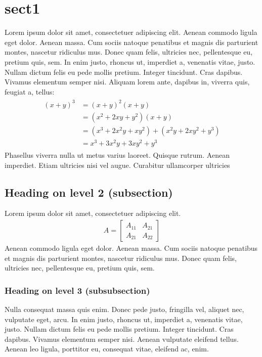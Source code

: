 \section{sect1}
Lorem ipsum dolor sit amet, consectetuer adipiscing elit. Aenean commodo ligula eget dolor. Aenean massa. Cum sociis natoque penatibus et magnis dis parturient montes, nascetur ridiculus mus. Donec quam felis, ultricies nec, pellentesque eu, pretium quis, sem. In enim justo, rhoncus ut, imperdiet a, venenatis vitae, justo. Nullam dictum felis eu pede mollis pretium. Integer tincidunt. Cras dapibus. Vivamus elementum semper nisi. Aliquam lorem ante, dapibus in, viverra quis, feugiat a, tellus:
\begin{align} 
	\begin{split}
	(x+y)^3 	&= (x+y)^2(x+y)\\
					&=(x^2+2xy+y^2)(x+y)\\
					&=(x^3+2x^2y+xy^2) + (x^2y+2xy^2+y^3)\\
					&=x^3+3x^2y+3xy^2+y^3
	\end{split}					
\end{align}
Phasellus viverra nulla ut metus varius laoreet. Quisque rutrum. Aenean imperdiet. Etiam ultricies nisi vel augue. Curabitur ullamcorper ultricies 

\subsection{Heading on level 2 (subsection)}
Lorem ipsum dolor sit amet, consectetuer adipiscing elit. 
\begin{align}
	A = 
	\begin{bmatrix}
	A_{11} & A_{21} \\
  	A_{21} & A_{22}
	\end{bmatrix}
\end{align}
Aenean commodo ligula eget dolor. Aenean massa. Cum sociis natoque penatibus et magnis dis parturient montes, nascetur ridiculus mus. Donec quam felis, ultricies nec, pellentesque eu, pretium quis, sem.

\subsubsection{Heading on level 3 (subsubsection)}
Nulla consequat massa quis enim. Donec pede justo, fringilla vel, aliquet nec, vulputate eget, arcu. In enim justo, rhoncus ut, imperdiet a, venenatis vitae, justo. Nullam dictum felis eu pede mollis pretium. Integer tincidunt. Cras dapibus. Vivamus elementum semper nisi. Aenean vulputate eleifend tellus. Aenean leo ligula, porttitor eu, consequat vitae, eleifend ac, enim.

